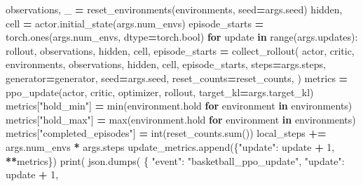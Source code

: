 \documentclass[
  american,
  11pt,
  letterpaper,
]{article}
\newenvironment{Shaded}{\begin{snugshade}}{\end{snugshade}}
\newcommand{\BuiltInTok}[1]{#1}
\newcommand{\ControlFlowTok}[1]{\textcolor[rgb]{0.13,0.29,0.53}{\textbf{#1}}}
\newcommand{\DecValTok}[1]{\textcolor[rgb]{0.00,0.00,0.81}{#1}}
\newcommand{\KeywordTok}[1]{\textcolor[rgb]{0.13,0.29,0.53}{\textbf{#1}}}
\newcommand{\NormalTok}[1]{#1}
\newcommand{\OperatorTok}[1]{\textcolor[rgb]{0.81,0.36,0.00}{\textbf{#1}}}
\newcommand{\StringTok}[1]{\textcolor[rgb]{0.31,0.60,0.02}{#1}}
\renewenvironment{Shaded}{\par\smallskip}{\par\smallskip}
\begin{document}
\begin{Shaded}
\begin{Highlighting}[]
\NormalTok{        observations, \_ }\OperatorTok{=}\NormalTok{ reset\_environments(environments, seed}\OperatorTok{=}\NormalTok{args.seed)}
\NormalTok{        hidden, cell }\OperatorTok{=}\NormalTok{ actor.initial\_state(args.num\_envs)}
\NormalTok{        episode\_starts }\OperatorTok{=}\NormalTok{ torch.ones(args.num\_envs, dtype}\OperatorTok{=}\NormalTok{torch.}\BuiltInTok{bool}\NormalTok{)}
        \ControlFlowTok{for}\NormalTok{ update }\KeywordTok{in} \BuiltInTok{range}\NormalTok{(args.updates):}
\NormalTok{            rollout, observations, hidden, cell, episode\_starts }\OperatorTok{=}\NormalTok{ collect\_rollout(}
\NormalTok{                actor,}
\NormalTok{                critic,}
\NormalTok{                environments,}
\NormalTok{                observations,}
\NormalTok{                hidden,}
\NormalTok{                cell,}
\NormalTok{                episode\_starts,}
\NormalTok{                steps}\OperatorTok{=}\NormalTok{args.steps,}
\NormalTok{                generator}\OperatorTok{=}\NormalTok{generator,}
\NormalTok{                seed}\OperatorTok{=}\NormalTok{args.seed,}
\NormalTok{                reset\_counts}\OperatorTok{=}\NormalTok{reset\_counts,}
\NormalTok{            )}
\NormalTok{            metrics }\OperatorTok{=}\NormalTok{ ppo\_update(actor, critic, optimizer, rollout, target\_kl}\OperatorTok{=}\NormalTok{args.target\_kl)}
\NormalTok{            metrics[}\StringTok{"hold\_min"}\NormalTok{] }\OperatorTok{=} \BuiltInTok{min}\NormalTok{(environment.hold }\ControlFlowTok{for}\NormalTok{ environment }\KeywordTok{in}\NormalTok{ environments)}
\NormalTok{            metrics[}\StringTok{"hold\_max"}\NormalTok{] }\OperatorTok{=} \BuiltInTok{max}\NormalTok{(environment.hold }\ControlFlowTok{for}\NormalTok{ environment }\KeywordTok{in}\NormalTok{ environments)}
\NormalTok{            metrics[}\StringTok{"completed\_episodes"}\NormalTok{] }\OperatorTok{=} \BuiltInTok{int}\NormalTok{(reset\_counts.}\BuiltInTok{sum}\NormalTok{())}
\NormalTok{            local\_steps }\OperatorTok{+=}\NormalTok{ args.num\_envs }\OperatorTok{*}\NormalTok{ args.steps}
\NormalTok{            update\_metrics.append(\{}\StringTok{"update"}\NormalTok{: update }\OperatorTok{+} \DecValTok{1}\NormalTok{, }\OperatorTok{**}\NormalTok{metrics\})}
            \BuiltInTok{print}\NormalTok{(}
\NormalTok{                json.dumps(}
\NormalTok{                    \{}
                        \StringTok{"event"}\NormalTok{: }\StringTok{"basketball\_ppo\_update"}\NormalTok{,}
                        \StringTok{"update"}\NormalTok{: update }\OperatorTok{+} \DecValTok{1}\NormalTok{,}

\end{Highlighting}
\end{Shaded}
\end{document}
